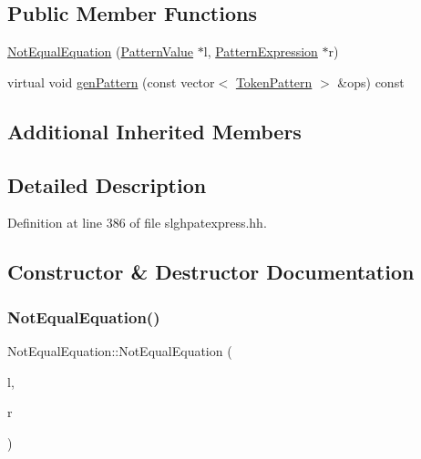 \subsection*{Public Member Functions}
\begin{DoxyCompactItemize}
\item 
\mbox{\hyperlink{class_not_equal_equation_a44bf0365359755856a29084bf4a04dce}{Not\+Equal\+Equation}} (\mbox{\hyperlink{class_pattern_value}{Pattern\+Value}} $\ast$l, \mbox{\hyperlink{class_pattern_expression}{Pattern\+Expression}} $\ast$r)
\item 
virtual void \mbox{\hyperlink{class_not_equal_equation_a9c356f48a2e47ea80c215b97d0b1fc65}{gen\+Pattern}} (const vector$<$ \mbox{\hyperlink{class_token_pattern}{Token\+Pattern}} $>$ \&ops) const
\end{DoxyCompactItemize}
\subsection*{Additional Inherited Members}


\subsection{Detailed Description}


Definition at line 386 of file slghpatexpress.\+hh.



\subsection{Constructor \& Destructor Documentation}
\mbox{\label{class_not_equal_equation_a44bf0365359755856a29084bf4a04dce}} 
\subsubsection{\texorpdfstring{NotEqualEquation()}{NotEqualEquation()}}
{\footnotesize\ttfamily Not\+Equal\+Equation\+::\+Not\+Equal\+Equation (\begin{DoxyParamCaption}\item[{\mbox{\hyperlink{class_pattern_value}{Pattern\+Value}} $\ast$}]{l,  }\item[{\mbox{\hyperlink{class_pattern_expression}{Pattern\+Expression}} $\ast$}]{r }\end{DoxyParamCaption})\hspace{0.3cm}{\ttfamily [inline]}}



